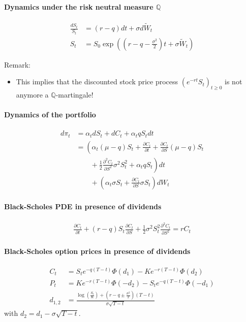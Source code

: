 \documentclass[a4paper,landscape,7pt,fleqn]{scrartcl}
\begin{document}
\begin{multicols*}{3}
\paragraph{Dynamics under the risk neutral measure $\mathbb{Q}$}
\begin{align*}
\frac{dS_t}{S_t} &= (r - q) dt + \sigma d \tilde W_t \\
S_t &= S_0 \exp \left( \left( r - q - \frac{\sigma^2}{2} \right) t + \sigma \tilde W_t \right)
\end{align*}

Remark:
\begin{itemize}
\item This implies that the discounted stock price process $\left( e^{-rt} S_t \right)_{t \geq 0}$ is not anymore a $\mathbb{Q}$-martingale!
\end{itemize}

\paragraph{Dynamics of the portfolio}
\begin{align*}
d\pi_t &= \alpha_t dS_t + dC_t + \alpha_t q S_t dt \\
&= \left( \alpha_t (\mu - q) S_t + \frac{\partial C_t}{\partial t} + \frac{\partial C_t}{\partial S} (\mu - q) S_t \right. \\
& \qquad + \left. \frac{1}{2} \frac{\partial^2 C_t}{\partial S^2} \sigma^2 S_t^2 + \alpha_t q S_t \right) dt \\
& \qquad + \left( \alpha_t \sigma S_t + \frac{\partial C_t}{\partial S} \sigma S_t \right) dW_t
\end{align*}

\paragraph{Black-Scholes PDE in presence of dividends}
\begin{align*}
\frac{\partial C_t}{\partial t} + (r-q) S_t \frac{\partial C_t}{\partial S} + \frac{1}{2} \sigma^2 S_t^2 \frac{\partial^2 C_t}{\partial S^2} = r C_t
\end{align*}

\paragraph{Black-Scholes option prices in presence of dividends}
\begin{align*}
C_t &= S_t e^{-q (T-t)} \Phi (d_1) - K e^{-r (T-t)} \Phi (d_2) \\
P_t &= K e^{-r (T-t)} \Phi (-d_2) - S_t e^{-q (T-t)} \Phi (-d_1) \\
d_{1,2} &= \frac{\log \left( \frac{S_t}{K} \right) + \left( r - q \pm \frac{\sigma^2}{2} \right) (T-t)}{\sigma \sqrt{T-t}}
\end{align*}
with $d_2 = d_1 - \sigma \sqrt{T-t}$.


\end{multicols*}
\end{document}
